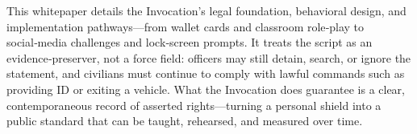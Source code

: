 This whitepaper details the Invocation’s legal foundation, behavioral design, and implementation pathways—from wallet cards and classroom role‑play to social‑media challenges and lock‑screen prompts. It treats the script as an evidence‑preserver, not a force field: officers may still detain, search, or ignore the statement, and civilians must continue to comply with lawful commands such as providing ID or exiting a vehicle. What the Invocation does guarantee is a clear, contemporaneous record of asserted rights—turning a personal shield into a public standard that can be taught, rehearsed, and measured over time.
